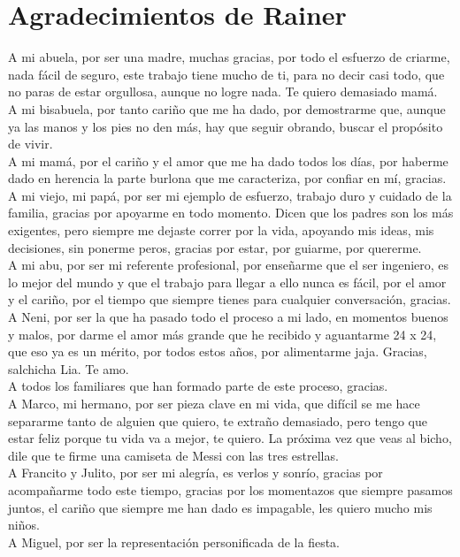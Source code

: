 \section*{Agradecimientos de Rainer}
A mi abuela, por ser una madre, muchas gracias, por todo el esfuerzo de criarme, nada fácil de seguro, este trabajo tiene mucho de ti, para no decir casi todo, que no paras de estar orgullosa, aunque no logre nada. Te quiero demasiado mamá. \\
A mi bisabuela, por tanto cariño que me ha dado, por demostrarme que, aunque ya las manos y los pies no den más, hay que seguir obrando, buscar el propósito de vivir. \\
A mi mamá, por el cariño y el amor que me ha dado todos los días, por haberme dado en herencia la parte burlona que me caracteriza, por confiar en mí, gracias. \\
A mi viejo, mi papá, por ser mi ejemplo de esfuerzo, trabajo duro y cuidado de la familia, gracias por apoyarme en todo momento. Dicen que los padres son los más exigentes, pero siempre me dejaste correr por la vida, apoyando mis ideas, mis decisiones, sin ponerme peros, gracias por estar, por guiarme, por quererme. \\
A mi abu, por ser mi referente profesional, por enseñarme que el ser ingeniero, es lo mejor del mundo y que el trabajo para llegar a ello nunca es fácil, por el amor y el cariño, por el tiempo que siempre tienes para cualquier conversación, gracias. \\
A Neni, por ser la que ha pasado todo el proceso a mi lado, en momentos buenos y malos, por darme el amor más grande que he recibido y aguantarme 24 x 24, que eso ya es un mérito, por todos estos años, por alimentarme jaja. Gracias, salchicha Lia. Te amo. \\
A todos los familiares que han formado parte de este proceso, gracias. \\
A Marco, mi hermano, por ser pieza clave en mi vida, que difícil se me hace separarme tanto de alguien que quiero, te extraño demasiado, pero tengo que estar feliz porque tu vida va a mejor, te quiero. La próxima vez que veas al bicho, dile que te firme una camiseta de Messi con las tres estrellas. \\
A Francito y Julito, por ser mi alegría, es verlos y sonrío, gracias por acompañarme todo este tiempo, gracias por los momentazos que siempre pasamos juntos, el cariño que siempre me han dado es impagable, les quiero mucho mis niños. \\
A Miguel, por ser la representación personificada de la fiesta. \\
